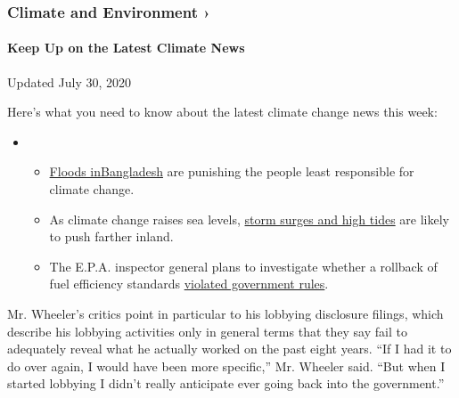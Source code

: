 \href{https://www.nytimes.com/section/climate?action=click\&pgtype=Article\&state=default\&region=MAIN_CONTENT_1\&context=storylines_keepup}{}

\hypertarget{climate-and-environment-}{%
\subsubsection{Climate and Environment
›}\label{climate-and-environment-}}

\hypertarget{keep-up-on-the-latest-climate-news}{%
\paragraph{Keep Up on the Latest Climate
News}\label{keep-up-on-the-latest-climate-news}}

Updated July 30, 2020

Here's what you need to know about the latest climate change news this
week:

\begin{itemize}
\item
  \begin{itemize}
  \tightlist
  \item
    \href{https://www.nytimes.com/2020/07/30/climate/bangladesh-floods.html?action=click\&pgtype=Article\&state=default\&region=MAIN_CONTENT_1\&context=storylines_keepup}{Floods
    in}\href{https://www.nytimes.com/2020/07/30/climate/bangladesh-floods.html?action=click\&pgtype=Article\&state=default\&region=MAIN_CONTENT_1\&context=storylines_keepup}{Bangladesh}
    are punishing the people least responsible for climate change.
  \item
    As climate change raises sea levels,
    \href{https://www.nytimes.com/2020/07/30/climate/sea-level-inland-floods.html?action=click\&pgtype=Article\&state=default\&region=MAIN_CONTENT_1\&context=storylines_keepup}{storm
    surges and high tides} are likely to push farther inland.
  \item
    The E.P.A. inspector general plans to investigate whether a rollback
    of fuel efficiency standards
    \href{https://www.nytimes.com/2020/07/27/climate/trump-fuel-efficiency-rule.html?action=click\&pgtype=Article\&state=default\&region=MAIN_CONTENT_1\&context=storylines_keepup}{violated
    government rules}.
  \end{itemize}
\end{itemize}

Mr. Wheeler's critics point in particular to his lobbying disclosure
filings, which describe his lobbying activities only in general terms
that they say fail to adequately reveal what he actually worked on the
past eight years. ``If I had it to do over again, I would have been more
specific,'' Mr. Wheeler said. ``But when I started lobbying I didn't
really anticipate ever going back into the government.''

